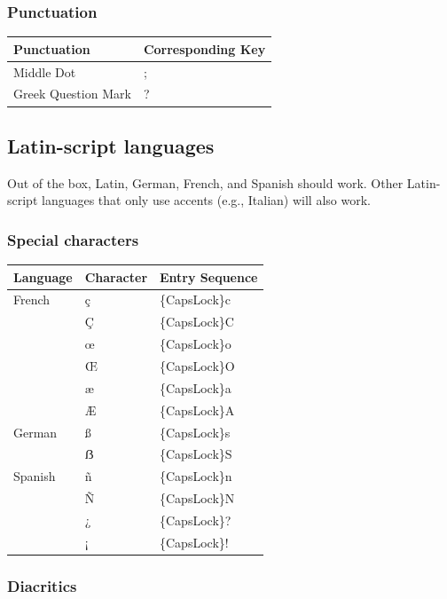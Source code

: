 \documentclass[11pt]{article}
\begin{document}
\subsubsection{Punctuation}
\label{sec:org74e4670}

\begin{center}
\begin{tabular}{ll}
Punctuation & Corresponding Key\\
\hline
Middle Dot & ;\\
Greek Question Mark & ?\\
\end{tabular}
\end{center}

\subsection{Latin-script languages}
\label{sec:org5d80c49}

Out of the box, Latin, German, French, and Spanish should work. Other Latin-script languages that only use accents (e.g., Italian) will also work.

\subsubsection{Special characters}
\label{sec:orgbdb4237}

\begin{center}
\begin{tabular}{lll}
Language & Character & Entry Sequence\\
\hline
French & ç & \{CapsLock\}c\\
 & Ç & \{CapsLock\}C\\
 & œ & \{CapsLock\}o\\
 & Œ & \{CapsLock\}O\\
 & æ & \{CapsLock\}a\\
 & Æ & \{CapsLock\}A\\
German & ß & \{CapsLock\}s\\
 & ẞ & \{CapsLock\}S\\
Spanish & ñ & \{CapsLock\}n\\
 & Ñ & \{CapsLock\}N\\
 & ¿ & \{CapsLock\}?\\
 & ¡ & \{CapsLock\}!\\
\end{tabular}
\end{center}

\subsubsection{Diacritics}
\label{sec:orgffd2549}
\end{document}
